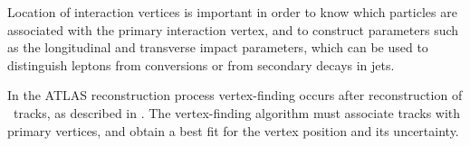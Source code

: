 Location of interaction vertices is 
important in order to know which particles are
associated with the primary interaction vertex, and to construct parameters such as the
longitudinal and transverse impact parameters, which can be used to distinguish 
leptons from conversions or from secondary decays in jets.

In the ATLAS reconstruction process vertex-finding occurs after reconstruction of
\id\ tracks, as described in . The
vertex-finding algorithm must associate tracks with primary vertices, and obtain
a best fit for the vertex position and its uncertainty. 

%



